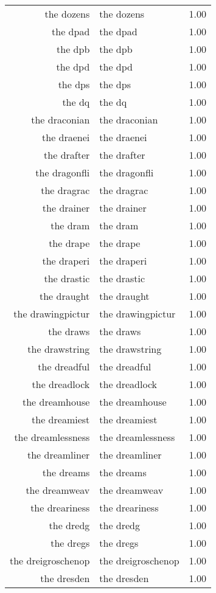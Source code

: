 \begin{table}[ht]
\begin{tabular}{rlr}
  the dozens & the dozens & 1.00 \\ 
  the dpad & the dpad & 1.00 \\ 
  the dpb & the dpb & 1.00 \\ 
  the dpd & the dpd & 1.00 \\ 
  the dps & the dps & 1.00 \\ 
  the dq & the dq & 1.00 \\ 
  the draconian & the draconian & 1.00 \\ 
  the draenei & the draenei & 1.00 \\ 
  the drafter & the drafter & 1.00 \\ 
  the dragonfli & the dragonfli & 1.00 \\ 
  the dragrac & the dragrac & 1.00 \\ 
  the drainer & the drainer & 1.00 \\ 
  the dram & the dram & 1.00 \\ 
  the drape & the drape & 1.00 \\ 
  the draperi & the draperi & 1.00 \\ 
  the drastic & the drastic & 1.00 \\ 
  the draught & the draught & 1.00 \\ 
  the drawingpictur & the drawingpictur & 1.00 \\ 
  the draws & the draws & 1.00 \\ 
  the drawstring & the drawstring & 1.00 \\ 
  the dreadful & the dreadful & 1.00 \\ 
  the dreadlock & the dreadlock & 1.00 \\ 
  the dreamhouse & the dreamhouse & 1.00 \\ 
  the dreamiest & the dreamiest & 1.00 \\ 
  the dreamlessness & the dreamlessness & 1.00 \\ 
  the dreamliner & the dreamliner & 1.00 \\ 
  the dreams & the dreams & 1.00 \\ 
  the dreamweav & the dreamweav & 1.00 \\ 
  the dreariness & the dreariness & 1.00 \\ 
  the dredg & the dredg & 1.00 \\ 
  the dregs & the dregs & 1.00 \\ 
  the dreigroschenop & the dreigroschenop & 1.00 \\ 
  the dresden & the dresden & 1.00 \\ 

\end{tabular}
\end{table}
